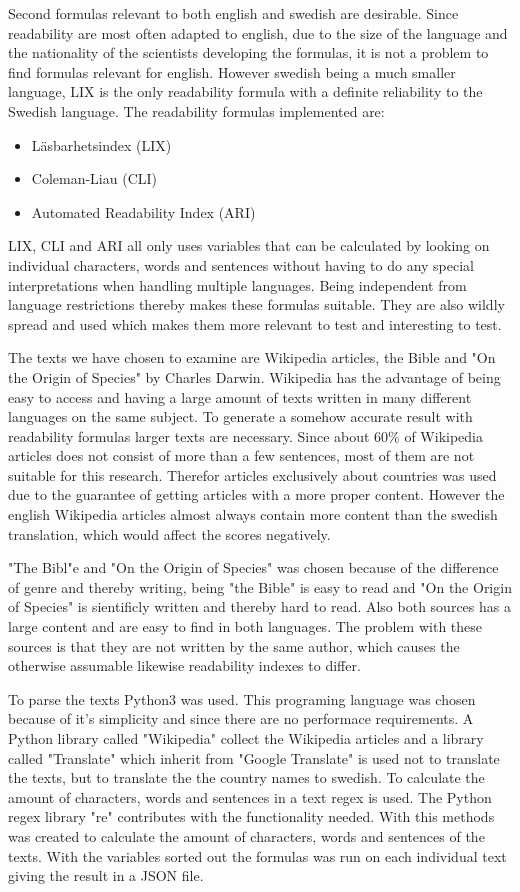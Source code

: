 \documentclass[a4paper]{article}
\begin{document}
Second formulas relevant to both english and swedish are desirable. Since readability are most often adapted to english, due to the size of the language and the nationality of the scientists developing the formulas, it is not a problem to find formulas relevant for english. However swedish being a much smaller language, LIX is the only readability formula with a definite reliability to the Swedish language. The readability formulas implemented are:
\begin{itemize}
    \item Läsbarhetsindex (LIX)
    \item Coleman-Liau (CLI)
    \item Automated Readability Index (ARI)
\end{itemize}
LIX, CLI and ARI all only uses variables that can be calculated by looking on individual characters, words and sentences without having to do any special interpretations when handling multiple languages. Being independent from language restrictions thereby makes these formulas suitable. They are also wildly spread and used which makes them more relevant to test and interesting to test.

The texts we have chosen to examine are Wikipedia articles, the Bible and "On the Origin of Species" by Charles Darwin\cite{darwinEN, darwinSV, bibleEN, bibleSV}. Wikipedia has the advantage of being easy to access and having a large amount of texts written in many different languages on the same subject. To generate a somehow accurate result with readability formulas larger texts are necessary. Since about 60\% of Wikipedia articles does not consist of more than a few sentences, most of them are not suitable for this research\cite{anderson12}. Therefor articles exclusively about countries was used due to the guarantee of getting articles with a more proper content. However the english Wikipedia articles almost always contain more content than the swedish translation, which would affect the scores negatively.

"The Bibl"e and "On the Origin of Species" was chosen because of the difference of genre and thereby writing, being "the Bible" is easy to read and "On the Origin of Species" is sientificly written and thereby hard to read. Also both sources has a large content and are easy to find in both languages. The problem with these sources is that they are not written by the same author, which causes the otherwise assumable likewise readability indexes to differ.

To parse the texts Python3 was used. This programing language was chosen because of it's simplicity and since there are no performace requirements. A Python library called "Wikipedia" collect the Wikipedia articles and a library called "Translate" which inherit from "Google Translate" is used not to translate the texts, but to translate the the country names to swedish. To calculate the amount of characters, words and sentences in a text regex is used. The Python regex library "re" contributes with the functionality needed. With this methods was created to calculate the amount of characters, words and sentences of the texts. With the variables sorted out the formulas was run on each individual text giving the result in a JSON file.
\end{document}
